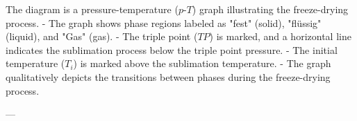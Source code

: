 The diagram is a pressure-temperature (\(p\)-\(T\)) graph illustrating the freeze-drying process.  
- The graph shows phase regions labeled as "fest" (solid), "flüssig" (liquid), and "Gas" (gas).  
- The triple point (\(TP\)) is marked, and a horizontal line indicates the sublimation process below the triple point pressure.  
- The initial temperature (\(T_i\)) is marked above the sublimation temperature.  
- The graph qualitatively depicts the transitions between phases during the freeze-drying process.

---